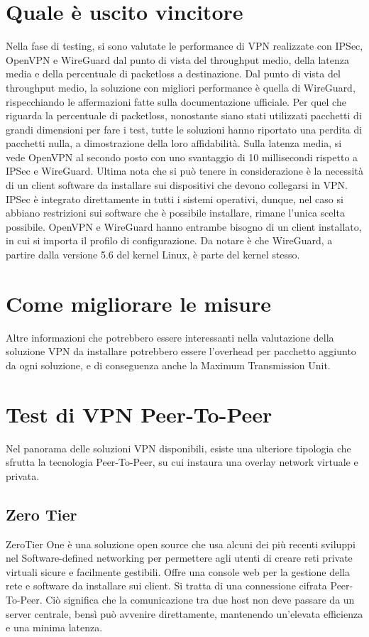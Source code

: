 \section{Quale è uscito vincitore}
Nella fase di testing, si sono valutate le performance di VPN realizzate con IPSec, OpenVPN e WireGuard dal punto di vista del throughput medio, della latenza media e della percentuale di packetloss a destinazione.
Dal punto di vista del throughput medio, la soluzione con migliori performance è quella di WireGuard, rispecchiando le affermazioni fatte sulla documentazione ufficiale.
Per quel che riguarda la percentuale di packetloss, nonostante siano stati utilizzati pacchetti di grandi dimensioni per fare i test, tutte le soluzioni hanno riportato una perdita di pacchetti nulla, a dimostrazione della loro affidabilità.
Sulla latenza media, si vede OpenVPN al secondo posto con uno svantaggio di 10 millisecondi rispetto a IPSec e WireGuard.
Ultima nota che si può tenere in considerazione è la necessità di un client software da installare sui dispositivi che devono collegarsi in VPN.
IPSec è integrato direttamente in tutti i sistemi operativi, dunque, nel caso si abbiano restrizioni sui software che è possibile installare, rimane l'unica scelta possibile.
OpenVPN e WireGuard hanno entrambe bisogno di un client installato, in cui si importa il profilo di configurazione. Da notare è che WireGuard, a partire dalla versione 5.6 del kernel Linux, è parte del kernel stesso.

\section{Come migliorare le misure}
Altre informazioni che potrebbero essere interessanti nella valutazione della soluzione VPN da installare potrebbero essere l'overhead per pacchetto aggiunto da ogni soluzione, e di conseguenza anche la Maximum Transmission Unit.


\section{Test di VPN Peer-To-Peer}
Nel panorama delle soluzioni VPN disponibili, esiste una ulteriore tipologia che sfrutta la tecnologia Peer-To-Peer, su cui instaura una overlay network virtuale e privata.

\subsection{Zero Tier}
ZeroTier One \cite{ZeroTier} è una soluzione open source che usa alcuni dei più recenti sviluppi nel Software-defined networking per permettere agli utenti di creare reti private virtuali sicure e facilmente gestibili. Offre una console web per la gestione della rete e software da installare sui client.
Si tratta di una connessione cifrata Peer-To-Peer. Ciò significa che la comunicazione tra due host non deve passare da un server centrale, bensì può avvenire direttamente, mantenendo un'elevata efficienza e una minima latenza.

